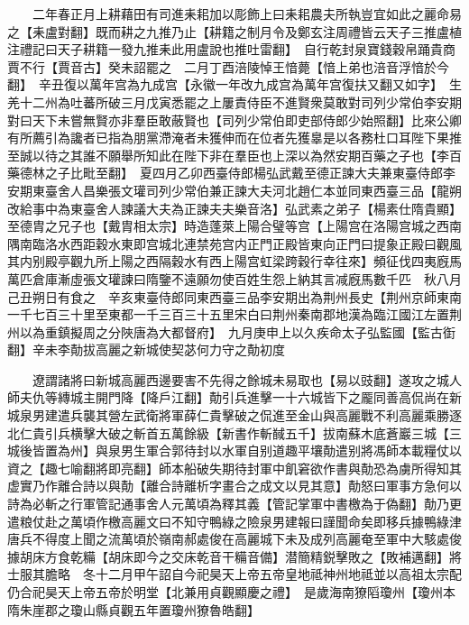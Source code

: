 　　二年春正月上耕藉田有司進耒耜加以彫飾上曰耒耜農夫所執豈宜如此之麗命易之【耒盧對翻】既而耕之九推乃止【耕籍之制月令及鄭玄注周禮皆云天子三推盧植注禮記曰天子耕籍一發九推耒此用盧說也推吐雷翻】　自行乾封泉寶錢穀帛踊貴商賈不行【賈音古】癸未詔罷之　二月丁酉涪陵悼王愔薨【愔上弟也涪音浮愔於今翻】　辛丑復以萬年宫為九成宫【永徽一年改九成宫為萬年宫復扶又翻又如字】　生羌十二州為吐蕃所破三月戊寅悉罷之上屢責侍臣不進賢衆莫敢對司列少常伯李安期對曰天下未嘗無賢亦非羣臣敢蔽賢也【司列少常伯即吏部侍郎少始照翻】比來公卿有所薦引為讒者已指為朋黨滯淹者未獲伸而在位者先獲辠是以各務杜口耳陛下果推至誠以待之其誰不願舉所知此在陛下非在羣臣也上深以為然安期百藥之子也【李百藥德林之子比毗至翻】　夏四月乙卯西臺侍郎楊弘武戴至德正諫大夫兼東臺侍郎李安期東臺舍人昌樂張文瓘司列少常伯兼正諫大夫河北趙仁本並同東西臺三品【龍朔改給事中為東臺舍人諫議大夫為正諫夫夫樂音洛】弘武素之弟子【楊素仕隋貴顯】至德胄之兄子也【戴胄相太宗】時造蓬萊上陽合璧等宫【上陽宫在洛陽宫城之西南隅南臨洛水西距穀水東即宫城北連禁苑宫内正門正殿皆東向正門曰提象正殿曰觀風其内别殿亭觀九所上陽之西隔穀水有西上陽宫虹梁跨穀行幸往來】頻征伐四夷廐馬萬匹倉庫漸虛張文瓘諫曰隋鑒不遠願勿使百姓生怨上納其言减廐馬數千匹　秋八月己丑朔日有食之　辛亥東臺侍郎同東西臺三品李安期出為荆州長史【荆州京師東南一千七百三十里至東都一千三百三十五里宋白曰荆州秦南郡地漢為臨江國江左置荆州以為重鎮擬周之分陜唐為大都督府】　九月庚申上以久疾命太子弘監國【監古衘翻】辛未李勣拔高麗之新城使契苾何力守之勣初度

　　遼謂諸將曰新城高麗西邊要害不先得之餘城未易取也【易以豉翻】遂攻之城人師夫仇等縳城主開門降【降戶江翻】勣引兵進擊一十六城皆下之龎同善高侃尚在新城泉男建遣兵襲其營左武衛將軍薛仁貴擊破之侃進至金山與高麗戰不利高麗乘勝逐北仁貴引兵横擊大破之斬首五萬餘級【新書作斬馘五千】拔南蘇木底蒼巖三城【三城後皆置為州】與泉男生軍合郭待封以水軍自别道趣平壤勣遣别將馮師本載糧仗以資之【趣七喻翻將即亮翻】師本船破失期待封軍中飢窘欲作書與勣恐為虜所得知其虚實乃作離合詩以與勣【離合詩離析字畫合之成文以見其意】勣怒曰軍事方急何以詩為必斬之行軍管記通事舍人元萬頃為釋其義【管記掌軍中書檄為于偽翻】勣乃更遣粮仗赴之萬頃作檄高麗文曰不知守鴨綠之險泉男建報曰謹聞命矣即移兵據鴨綠津唐兵不得度上聞之流萬頃於嶺南郝處俊在高麗城下未及成列高麗奄至軍中大駭處俊據胡床方食乾糒【胡床即今之交床乾音干糒音備】潜簡精鋭擊敗之【敗補邁翻】將士服其膽略　冬十二月甲午詔自今祀昊天上帝五帝皇地祗神州地祗並以高祖太宗配仍合祀昊天上帝五帝於明堂【北兼用貞觀顯慶之禮】　是歲海南獠䧟瓊州【瓊州本隋朱崖郡之瓊山縣貞觀五年置瓊州獠魯皓翻】

